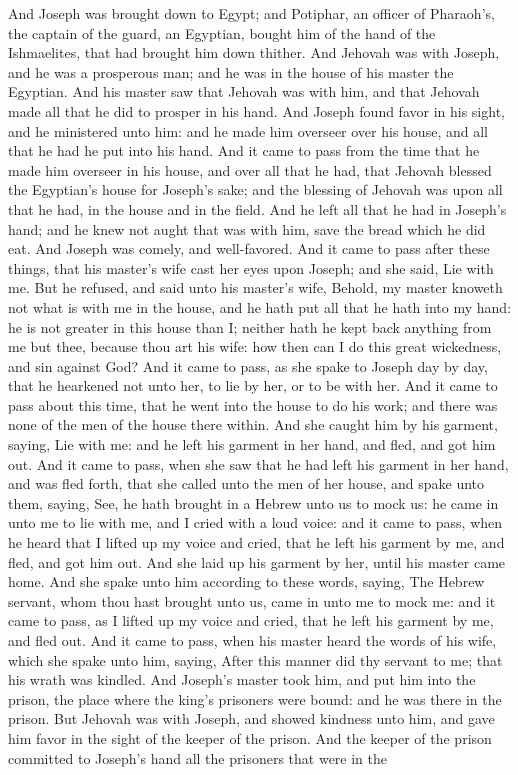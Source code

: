 And Joseph was brought down to Egypt; and Potiphar, an officer of Pharaoh’s, the captain of the guard, an Egyptian, bought him of the hand of the Ishmaelites, that had brought him down thither. And Jehovah was with Joseph, and he was a prosperous man; and he was in the house of his master the Egyptian. And his master saw that Jehovah was with him, and that Jehovah made all that he did to prosper in his hand. And Joseph found favor in his sight, and he ministered unto him: and he made him overseer over his house, and all that he had he put into his hand. And it came to pass from the time that he made him overseer in his house, and over all that he had, that Jehovah blessed the Egyptian’s house for Joseph’s sake; and the blessing of Jehovah was upon all that he had, in the house and in the field. And he left all that he had in Joseph’s hand; and he knew not aught that was with him, save the bread which he did eat. And Joseph was comely, and well-favored.  And it came to pass after these things, that his master’s wife cast her eyes upon Joseph; and she said, Lie with me. But he refused, and said unto his master’s wife, Behold, my master knoweth not what is with me in the house, and he hath put all that he hath into my hand: he is not greater in this house than I; neither hath he kept back anything from me but thee, because thou art his wife: how then can I do this great wickedness, and sin against God? And it came to pass, as she spake to Joseph day by day, that he hearkened not unto her, to lie by her, or to be with her. And it came to pass about this time, that he went into the house to do his work; and there was none of the men of the house there within. And she caught him by his garment, saying, Lie with me: and he left his garment in her hand, and fled, and got him out. And it came to pass, when she saw that he had left his garment in her hand, and was fled forth, that she called unto the men of her house, and spake unto them, saying, See, he hath brought in a Hebrew unto us to mock us: he came in unto me to lie with me, and I cried with a loud voice: and it came to pass, when he heard that I lifted up my voice and cried, that he left his garment by me, and fled, and got him out. And she laid up his garment by her, until his master came home. And she spake unto him according to these words, saying, The Hebrew servant, whom thou hast brought unto us, came in unto me to mock me: and it came to pass, as I lifted up my voice and cried, that he left his garment by me, and fled out.  And it came to pass, when his master heard the words of his wife, which she spake unto him, saying, After this manner did thy servant to me; that his wrath was kindled. And Joseph’s master took him, and put him into the prison, the place where the king’s prisoners were bound: and he was there in the prison. But Jehovah was with Joseph, and showed kindness unto him, and gave him favor in the sight of the keeper of the prison. And the keeper of the prison committed to Joseph’s hand all the prisoners that were in the 